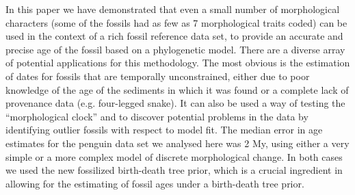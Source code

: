 \documentclass[11pt]{article}
\begin{document}
In this paper we have demonstrated that even a small number of morphological characters (some of the fossils had as few as 7 morphological traits coded) can be used in the context of a rich fossil reference data set, to provide an accurate and precise age of the fossil based on a phylogenetic model. 
There are a diverse array of potential applications for this methodology. 
The most obvious is the estimation of dates for fossils that are temporally unconstrained, either due to poor knowledge of the age of the sediments in which it was found or a complete lack of provenance data (e.g. four-legged snake). 
It can also be used a way of testing the ``morphological clock'' and to discover potential problems in the data by identifying outlier fossils with respect to model fit. 
The median error in age estimates for the penguin data set we analysed here was 2 My, using either a very simple or a more complex model of discrete morphological change. In both cases we used the new fossilized birth-death tree prior, which is a crucial ingredient in allowing for the estimating of fossil ages under a birth-death tree prior.

\printbibliography
\end{document}
